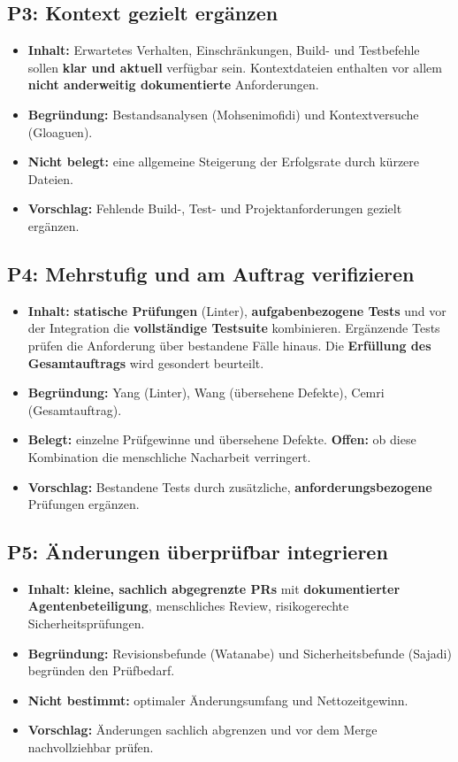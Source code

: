 \documentclass[12pt,a4paper]{article}
\begin{document}
\subsection*{P3: Kontext gezielt ergänzen}
\begin{itemize}
  \item \textbf{Inhalt:} Erwartetes Verhalten, Einschränkungen, Build- und Testbefehle sollen \textbf{klar und aktuell} verfügbar sein. Kontextdateien enthalten vor allem \textbf{nicht anderweitig dokumentierte} Anforderungen.
  \item \textbf{Begründung:} Bestandsanalysen (Mohsenimofidi) und Kontextversuche (Gloaguen).
  \item \textbf{Nicht belegt:} eine allgemeine Steigerung der Erfolgsrate durch kürzere Dateien.
  \item \textbf{Vorschlag:} Fehlende Build-, Test- und Projektanforderungen gezielt ergänzen.
\end{itemize}

\subsection*{P4: Mehrstufig und am Auftrag verifizieren}
\begin{itemize}
  \item \textbf{Inhalt:} \textbf{statische Prüfungen} (Linter), \textbf{aufgabenbezogene Tests} und vor der Integration die \textbf{vollständige Testsuite} kombinieren. Ergänzende Tests prüfen die Anforderung über bestandene Fälle hinaus. Die \textbf{Erfüllung des Gesamtauftrags} wird gesondert beurteilt.
  \item \textbf{Begründung:} Yang (Linter), Wang (übersehene Defekte), Cemri (Gesamtauftrag).
  \item \textbf{Belegt:} einzelne Prüfgewinne und übersehene Defekte. \textbf{Offen:} ob diese Kombination die menschliche Nacharbeit verringert.
  \item \textbf{Vorschlag:} Bestandene Tests durch zusätzliche, \textbf{anforderungsbezogene} Prüfungen ergänzen.
\end{itemize}

\subsection*{P5: Änderungen überprüfbar integrieren}
\begin{itemize}
  \item \textbf{Inhalt:} \textbf{kleine, sachlich abgegrenzte PRs} mit \textbf{dokumentierter Agentenbeteiligung}, menschliches Review, risikogerechte Sicherheitsprüfungen.
  \item \textbf{Begründung:} Revisionsbefunde (Watanabe) und Sicherheitsbefunde (Sajadi) begründen den Prüfbedarf.
  \item \textbf{Nicht bestimmt:} optimaler Änderungsumfang und Nettozeitgewinn.
  \item \textbf{Vorschlag:} Änderungen sachlich abgrenzen und vor dem Merge nachvollziehbar prüfen.
\end{itemize}
\end{document}
